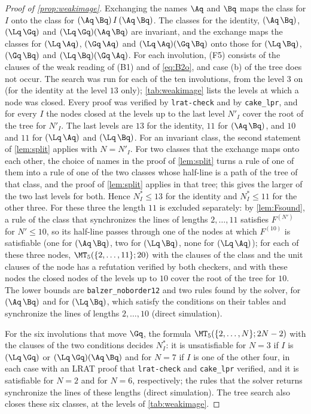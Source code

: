 \begin{proof}[Proof of \cref{prop:weakimage}]
Exchanging the names $\Aq$ and $\Bq$ maps the class for $I$ onto the class for
$(\Aq\,\Bq)\,I\,(\Aq\,\Bq)$. The classes for the identity, $(\Aq\,\Bq)$,
$(\Lq\,\Gq)$ and $(\Lq\,\Gq)(\Aq\,\Bq)$ are invariant, and the exchange maps the
classes for $(\Lq\,\Aq)$, $(\Gq\,\Aq)$ and $(\Lq\,\Aq)(\Gq\,\Bq)$ onto those for
$(\Lq\,\Bq)$, $(\Gq\,\Bq)$ and $(\Lq\,\Bq)(\Gq\,\Aq)$. For each involution, (F5)
consists of the clauses of the weak reading of (B1) and of \eqref{eq:B2o}, and
case (b) of the tree does not occur. The search was run for each of the ten
involutions, from the level $3$ on (for the identity at the level $13$ only);
\cref{tab:weakimage} lists the levels at which a node was closed. Every proof
was verified by \texttt{lrat-check} and by \texttt{cake\_lpr}, and for every $I$
the nodes closed at the levels up to the last level $N'_I$ cover the root of
the tree for $N'_I$. The last levels are $13$ for the identity, $11$ for
$(\Aq\,\Bq)$, and $10$ and $11$ for $(\Lq\,\Aq)$ and $(\Lq\,\Bq)$. For an
invariant class, the second statement of \cref{lem:split} applies with
$N=N'_I$. For two classes that the exchange maps onto each other, the choice of
names in the proof of \cref{lem:split} turns a rule of one of them into a rule
of one of the two classes whose half-line is a path of the tree of that class,
and the proof of \cref{lem:split} applies in that tree; this gives the larger
of the two last levels for both. Hence $N^\ast_I\le13$ for the identity and
$N^\ast_I\le11$ for the other three. For these three the length $11$ is
excluded separately: by \cref{lem:Fsound}, a rule of the class that synchronizes
the lines of lengths $2,\dots,11$ satisfies $F^{(N')}$ for $N'\le10$, so its
half-line passes through one of the nodes at which $F^{(10)}$ is satisfiable
(one for $(\Aq\,\Bq)$, two for $(\Lq\,\Bq)$, none for $(\Lq\,\Aq)$); for each of
these three nodes, $\MT_5(\{2,\dots,11\};20)$ with the clauses of the class and
the unit clauses of the node has a refutation verified by both checkers, and
with these nodes the closed nodes of the levels up to $10$ cover the root of
the tree for $10$. The lower bounds are
\texttt{balzer\_noborder12} and two rules found by the solver, for
$(\Aq\,\Bq)$ and for $(\Lq\,\Bq)$, which satisfy the conditions on their tables
and synchronize the lines of lengths $2,\dots,10$ (direct simulation).

For the six involutions that move $\Gq$, the formula
$\MT_5(\{2,\dots,N\};2N-2)$ with the clauses of the two conditions decides
$N^\ast_I$: it is unsatisfiable for $N=3$ if $I$ is $(\Lq\,\Gq)$ or
$(\Lq\,\Gq)(\Aq\,\Bq)$ and for $N=7$ if $I$ is one of the other four, in each
case with an LRAT proof that \texttt{lrat-check} and \texttt{cake\_lpr} verified,
and it is satisfiable for $N=2$ and for $N=6$, respectively; the rules that the
solver returns synchronize the lines of these lengths (direct simulation). The
tree search also closes these six classes, at the levels of
\cref{tab:weakimage}.
\end{proof}

